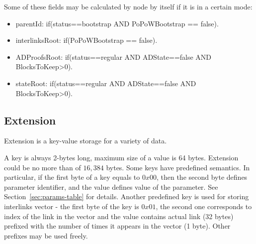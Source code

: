 \vspace{1em}
Some of these fields may be calculated by node by itself if it is in a certain mode:

\begin{itemize}
    \item parentId: if(status==bootstrap AND PoPoWBootstrap == false).
    \item interlinksRoot: if(PoPoWBootstrap == false).
    \item ADProofsRoot: if(status==regular AND ADState==false AND BlocksToKeep>0).
    \item stateRoot: if(status==regular AND ADState==false AND BlocksToKeep>0).
\end{itemize}

\subsection{Extension}
\label{sec:extension}

Extension is a key-value storage for a variety of data.

A key is always 2-bytes long, maximum size of a value is 64 bytes. Extension could be no more than of $16,384$ bytes.
Some keys have predefined semantics. In particular, if the first byte of a key equals to $0x00$, then the second byte
defines parameter identifier, and the value defines value of the parameter. See Section~\ref{sec:params-table}
for details. Another predefined key is used for storing interlinks vector - the first byte of the key is $0x01$,
the second one corresponds to index of the link in the vector and the value contains actual link (32 bytes) prefixed
with the number of times it appears in the vector (1 byte). Other prefixes may be used freely.




